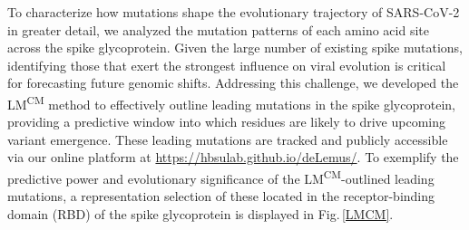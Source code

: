 \documentclass[%
 reprint,
superscriptaddress,
 amsmath,amssymb,
 aps,
]{revtex4-2}
\begin{document}


To characterize how mutations shape the evolutionary trajectory of SARS-CoV-2 in greater detail, we analyzed the mutation patterns of each amino acid site across the spike glycoprotein. Given the large number of existing spike mutations, identifying those that exert the strongest influence on viral evolution is critical for forecasting future genomic shifts. Addressing this challenge, we developed the LM\textsuperscript{CM} method to effectively outline leading mutations in the spike glycoprotein, providing a predictive window into which residues are likely to drive upcoming variant emergence. These leading mutations are tracked and publicly accessible via our online platform at \href{https://hbsulab.github.io/deLemus/}{https://hbsulab.github.io/deLemus/}. To exemplify the predictive power and evolutionary significance of the LM\textsuperscript{CM}-outlined leading mutations, a representation selection of these located in the receptor-binding domain (RBD) of the spike glycoprotein is displayed in Fig.\,\ref{LMCM}.
\end{document}

